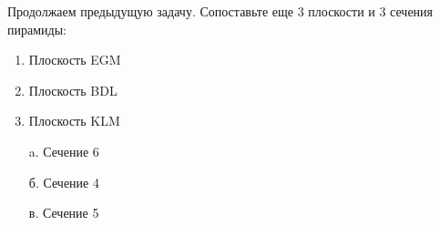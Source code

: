 
Продолжаем предыдущую задачу.  Сопоставьте еще 3 плоскости и 3 сечения пирамиды:


\begin{multicols}{2}
    {
        \begin{enumerate}
            \item Плоскость EGM
            \item Плоскость BDL
            \item Плоскость KLM
        \end{enumerate}
    }
    {
        \begin{enumerate}
            \item[a.] Сечение 6
            \item[б.] Сечение 4
            \item[в.] Сечение 5  
        \end{enumerate}
    }
    
\end{multicols}

